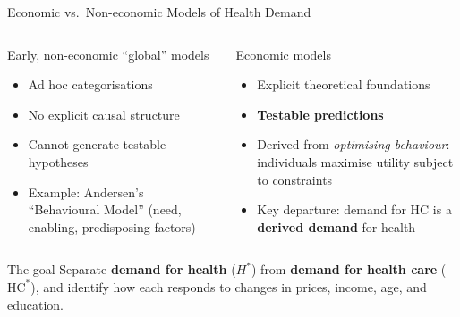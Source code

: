 \documentclass[aspectratio=169, 12pt]{beamer}
\begin{document}
\begin{frame}{Economic vs.\ Non-economic Models of Health Demand}
  \begin{columns}
      \begin{block}{Early, non-economic ``global'' models}
        \small
        \begin{itemize}
          \item Ad hoc categorisations
          \item No explicit causal structure
          \item Cannot generate testable hypotheses
          \item Example: Andersen's ``Behavioural Model'' (need, enabling, predisposing factors)
        \end{itemize}
      \end{block}
      \begin{alertblock}{Economic models}
        \small
        \begin{itemize}
          \item Explicit theoretical foundations
          \item \textbf{Testable predictions}
          \item Derived from \emph{optimising behaviour}: individuals maximise utility subject
                to constraints
          \item Key departure: demand for HC is a \textbf{derived demand} for health
        \end{itemize}
      \end{alertblock}
  \end{columns}
  \vspace{0.3em}
  \begin{exampleblock}{The goal}
    \small Separate \textbf{demand for health} ($H^*$) from \textbf{demand for health care} ($\text{HC}^*$),
    and identify how each responds to changes in prices, income, age, and education.
  \end{exampleblock}
\end{frame}
\end{document}
